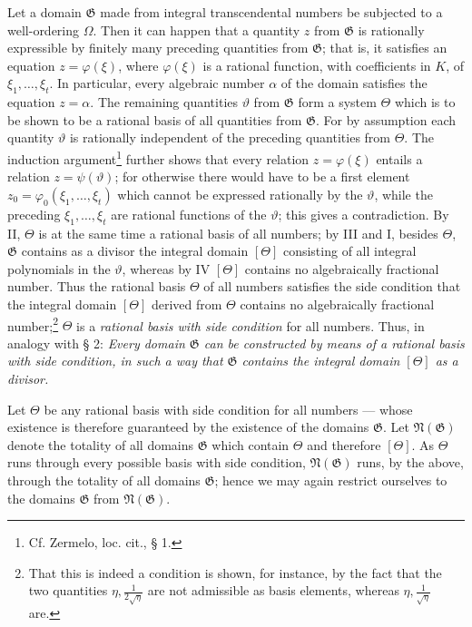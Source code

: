 \documentclass[11pt]{article}
\begin{document}
Let a domain $\mathfrak G$ made from integral transcendental numbers be subjected
to a well-ordering $\Omega$. Then it can happen that a quantity $z$ from
$\mathfrak G$ is rationally expressible by finitely many preceding quantities
from $\mathfrak G$; that is, it satisfies an equation $z=\varphi(\xi)$, where
$\varphi(\xi)$ is a rational function, with coefficients in $K$, of
$\xi_1,\ldots,\xi_t$. In particular, every algebraic number $\alpha$ of the
domain satisfies the equation $z=\alpha$. The remaining quantities $\vartheta$
from $\mathfrak G$ form a system $\Theta$ which is to be shown to be a rational
basis of all quantities from $\mathfrak G$. For by assumption each quantity
$\vartheta$ is rationally independent of the preceding quantities from $\Theta$.
The induction argument\footnote{Cf. Zermelo, loc. cit., § 1.} further shows
that every relation $z=\varphi(\xi)$ entails a relation $z=\psi(\vartheta)$; for
otherwise there would have to be a first element
$z_0=\varphi_0(\xi_1,\ldots,\xi_t)$ which cannot be expressed rationally by the
$\vartheta$, while the preceding $\xi_1,\ldots,\xi_t$ are rational functions of
the $\vartheta$; this gives a contradiction. By II, $\Theta$ is at the same time
a rational basis of all numbers; by III and I, besides $\Theta$, $\mathfrak G$
contains as a divisor the integral domain $[\Theta]$ consisting of all integral
polynomials in the $\vartheta$, whereas by IV $[\Theta]$ contains no
algebraically fractional number. Thus the rational basis $\Theta$ of all numbers
satisfies the side condition that the integral domain $[\Theta]$ derived from
$\Theta$ contains no algebraically fractional number;\footnote{That this is
indeed a condition is shown, for instance, by the fact that the two quantities
$\eta,\frac1{2\sqrt{\eta}}$ are not admissible as basis elements, whereas
$\eta,\frac1{\sqrt{\eta}}$ are.} $\Theta$ is a \emph{rational basis with side
condition} for all numbers. Thus, in analogy with § 2: \emph{Every domain
$\mathfrak G$ can be constructed by means of a rational basis with side
condition, in such a way that $\mathfrak G$ contains the integral domain
$[\Theta]$ as a divisor.}

Let $\Theta$ be any rational basis with side condition for all numbers --- whose
existence is therefore guaranteed by the existence of the domains $\mathfrak G$.
Let $\mathfrak N(\mathfrak G)$ denote the totality of all domains $\mathfrak G$
which contain $\Theta$ and therefore $[\Theta]$. As $\Theta$ runs through every
possible basis with side condition, $\mathfrak N(\mathfrak G)$ runs, by the
above, through the totality of all domains $\mathfrak G$; hence we may again
restrict ourselves to the domains $\mathfrak G$ from $\mathfrak N(\mathfrak G)$.
\end{document}
